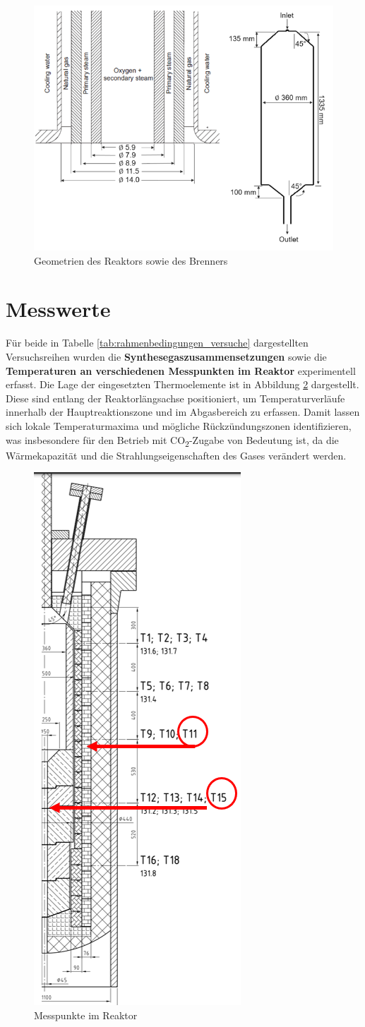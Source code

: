         \begin{figure}[H]
            \centering
            \includegraphics[width=0.8\linewidth]{img/sonstiges/Reaktorgeometrien.png}
            \caption{Geometrien des Reaktors sowie des Brenners}
            \label{fig:reaktorgeometrie}
        \end{figure}
        
        \section{Messwerte}
        Für beide in Tabelle \ref{tab:rahmenbedingungen_versuche} dargestellten Versuchsreihen wurden die \textbf{Synthesegaszusammensetzungen} sowie die \textbf{Temperaturen an verschiedenen Messpunkten im Reaktor} experimentell erfasst.  
        Die Lage der eingesetzten Thermoelemente ist in Abbildung \ref{fig:erweiterungen_messpunkte} dargestellt. Diese sind entlang der Reaktorlängsachse positioniert, um Temperaturverläufe innerhalb der Hauptreaktionszone und im Abgasbereich zu erfassen. Damit lassen sich lokale Temperaturmaxima und mögliche Rückzündungszonen identifizieren, was insbesondere für den Betrieb mit CO\textsubscript{2}-Zugabe von Bedeutung ist, da die Wärmekapazität und die Strahlungseigenschaften des Gases verändert werden.
        
        \begin{figure}[H]
            \centering
            \includegraphics[width=0.2\linewidth]{img/Erweiterungen/Messpunkte.png}
            \caption{Messpunkte im Reaktor \cite{gonzales}}
            \label{fig:erweiterungen_messpunkte}
        \end{figure}
        

